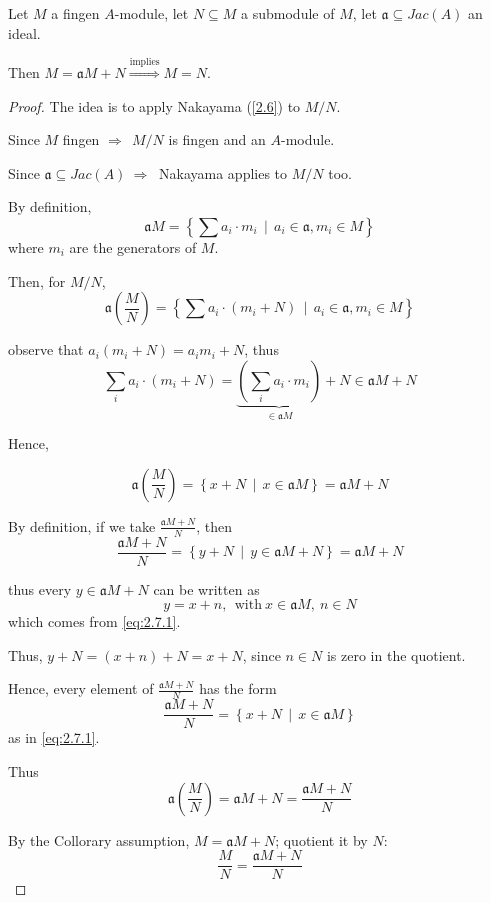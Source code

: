 \documentclass{article}
\theoremstyle{definition}
\newenvironment{cor}[1]
{\renewcommand\theinnercor{#1}\innercor}
{\endinnercor}
\newcommand{\aA}{\mathfrak{a}} %
\begin{document}
\begin{cor}{AM.2.7} \label{2.7}
  Let $M$ a fingen $A$-module, let $N \subseteq M$ a submodule of $M$, let $\aA \subseteq Jac(A)$ an ideal.

  Then $M = \aA M + N \stackrel{\text{implies}}{\Longrightarrow} M=N$.
\end{cor}
\begin{proof}
  The idea is to apply Nakayama (\ref{2.6}) to $M/N$.

  Since $M$ fingen $\Longrightarrow~~ M/N$ is fingen and an $A$-module.

  Since $\aA \subseteq Jac(A) ~\Longrightarrow~$ Nakayama applies to $M/N$ too.

  By definition,
  $$\aA M = \left\{ \sum a_i \cdot m_i ~~|~~ a_i \in \aA, m_i \in M \right\}$$
  where $m_i$ are the generators of $M$.

  Then, for $M/N$,
  $$\aA (\frac{M}{N}) = \left\{ \sum a_i \cdot (m_i + N) ~~|~~ a_i \in \aA, m_i \in M \right\}$$

  observe that $a_i(m_i+N)= a_i m_i +N$, thus
  $$\sum_i a_i \cdot (m_i + N) = \underbrace{(\sum_i a_i \cdot m_i)}_{\in \aA M} + N \in \aA M + N$$

  Hence,

  \begin{equation}
    \aA (\frac{M}{N}) = \left\{ x + N ~~|~~ x \in \aA M \right\} = \aA M + N
    \label{eq:2.7.1}
  \end{equation}

  By definition, if we take $\frac{\aA M + N}{N}$, then
  $$\frac{\aA M + N}{N} = \left\{ y + N ~~|~~ y \in \aA M +N \right\} = \aA M + N$$

  thus every $y \in \aA M +N$ can be written as
  $$y=x+n,~~ \text{with}~ x \in \aA M,~ n\in N$$
  which comes from \eqref{eq:2.7.1}.

  Thus, $y + N = (x+n)+N = x+N$, since $n \in N$ is zero in the quotient.
  
  Hence, every element of $\frac{\aA M +N}{N}$ has the form
  $$\frac{\aA M + N}{N} = \left\{ x + N ~~|~~ x \in \aA M \right\}$$
  as in \eqref{eq:2.7.1}.

  Thus
  \begin{equation}
    \aA (\frac{M}{N}) = \aA M + N = \frac{\aA M +N}{N}
    \label{eq:2.7.2}
  \end{equation}

  By the Collorary assumption, $M = \aA M + N$; quotient it by $N$:
  \begin{equation}
    \frac{M}{N} = \frac{\aA M +N}{N}
  \label{eq:2.7.3}
  \end{equation}


\end{proof}
\end{document}

